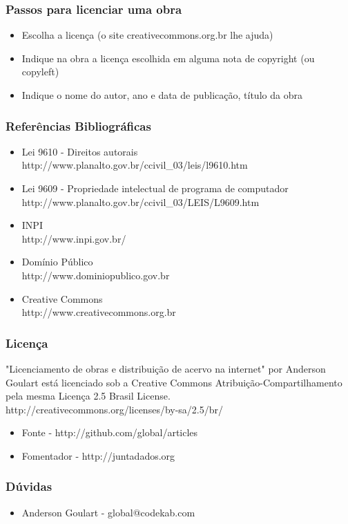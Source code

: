 \documentclass{beamer}
\begin{document}
\frame
{
	\frametitle{Passos para licenciar uma obra}
	\begin{itemize}
		\item Escolha a licença (o site creativecommons.org.br lhe ajuda)
		\item Indique na obra a licença escolhida em alguma nota de copyright (ou copyleft)
		\item Indique o nome do autor, ano e data de publicação, título da obra
	\end{itemize}
}

\frame
{
	\frametitle{Referências Bibliográficas}
	\begin{itemize}
		\item Lei 9610 - Direitos autorais\\
		http://www.planalto.gov.br/ccivil\_03/leis/l9610.htm
		\item Lei 9609 - Propriedade intelectual de programa de computador\\
		http://www.planalto.gov.br/ccivil\_03/LEIS/L9609.htm
		\item INPI\\
		http://www.inpi.gov.br/
		\item Domínio Público\\
		http://www.dominiopublico.gov.br
		\item Creative Commons\\
		http://www.creativecommons.org.br
	\end{itemize}

}


\frame
{
	\frametitle{Licença}
	"Licenciamento de obras e distribuição de acervo na internet" por Anderson Goulart está licenciado sob a Creative Commons Atribuição-Compartilhamento pela mesma Licença 2.5 Brasil License.\\

	http://creativecommons.org/licenses/by-sa/2.5/br/\\

	\begin{itemize}
		\item Fonte - http://github.com/global/articles
		\item Fomentador - http://juntadados.org
	\end{itemize}
}


\frame
{
	\frametitle{Dúvidas}
	\begin{itemize}
		\item Anderson Goulart - global@codekab.com
	\end{itemize}
	

}
\end{document}

